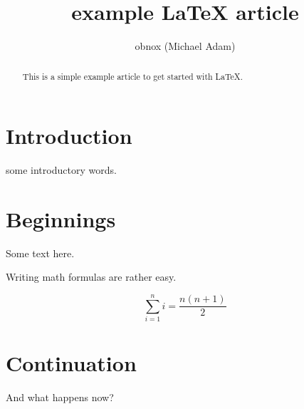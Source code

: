 \documentclass{article}
\title{example {\LaTeX} article}
\author{obnox (Michael Adam)}
\begin{document}
\maketitle
\begin{abstract}

    This is a simple  example article to get started with  {\LaTeX}.

\end{abstract}

\tableofcontents

\section*{Introduction}

some introductory words.

\section{Beginnings}

Some text here.


Writing math formulas are rather easy.


\[ \sum_{i=1}^{n}i = \frac{n(n+1)}{2} \]

\section{Continuation}

And what happens now?
\end{document}
